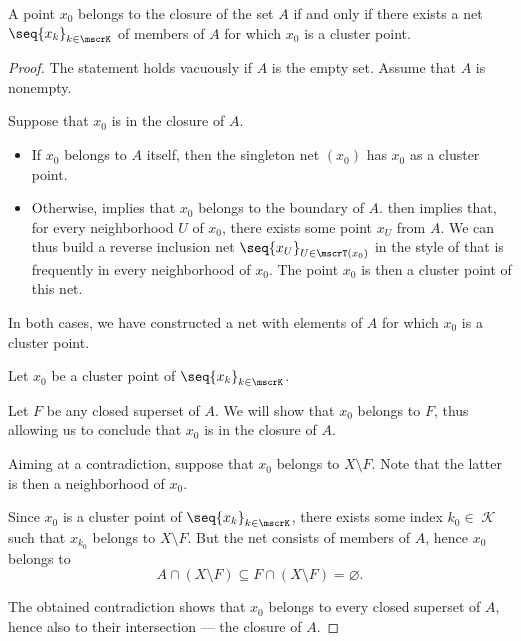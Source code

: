 \begin{proposition}\label{thm:cluster_point_iff_in_closure}
  A point \( x_0 \) belongs to the closure of the set \( A \) if and only if there exists a net \( \seq{ x_k }_{k \in \mscrK} \) of members of \( A \) for which \( x_0 \) is a cluster point.
\end{proposition}
\begin{proof}
  The statement holds vacuously if \( A \) is the empty set. Assume that \( A \) is nonempty.

  \SufficiencySubProof Suppose that \( x_0 \) is in the closure of \( A \).
  \begin{itemize}
    \item If \( x_0 \) belongs to \( A \) itself, then the singleton net \( (x_0) \) has \( x_0 \) as a cluster point.
    \item Otherwise,  implies that \( x_0 \) belongs to the boundary of \( A \).  then implies that, for every neighborhood \( U \) of \( x_0 \), there exists some point \( x_U \) from \( A \). We can thus build a reverse inclusion net \( \seq{ x_U }_{U \in \mscrT(x_0)} \) in the style of  that is frequently in every neighborhood of \( x_0 \). The point \( x_0 \) is then a cluster point of this net.
  \end{itemize}

  In both cases, we have constructed a net with elements of \( A \) for which \( x_0 \) is a cluster point.

  \NecessitySubProof Let \( x_0 \) be a cluster point of \( \seq{ x_k }_{k \in \mscrK} \).

  Let \( F \) be any closed superset of \( A \). We will show that \( x_0 \) belongs to \( F \), thus allowing us to conclude that \( x_0 \) is in the closure of \( A \).

  Aiming at a contradiction, suppose that \( x_0 \) belongs to \( X \setminus F \). Note that the latter is then a neighborhood of \( x_0 \).

  Since \( x_0 \) is a cluster point of \( \seq{ x_k }_{k \in \mscrK} \), there exists some index \( k_0 \in \mscrK \) such that \( x_{k_0} \) belongs to \( X \setminus F \). But the net consists of members of \( A \), hence \( x_0 \) belongs to
  \begin{equation*}
    A \cap (X \setminus F) \subseteq F \cap (X \setminus F) = \varnothing.
  \end{equation*}

  The obtained contradiction shows that \( x_0 \) belongs to every closed superset of \( A \), hence also to their intersection --- the closure of \( A \).
\end{proof}

